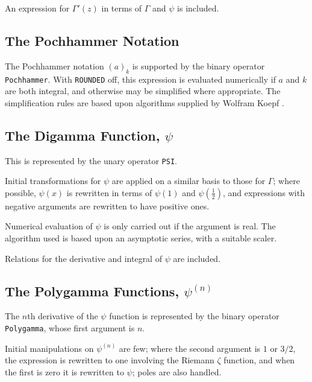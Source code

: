 \documentclass[11pt]{article}
\begin{document}
An expression for $\Gamma'(z)$ in terms of $\Gamma$ and $\psi$ is
included.



\subsection{The Pochhammer Notation}

The Pochhammer notation $(a)_k$ is supported by the binary operator {\tt
Pochhammer}.  With {\tt ROUNDED} off, this expression is evaluated
numerically if $a$ and $k$ are both integral, and otherwise may be
simplified where appropriate.  The simplification rules are based upon
algorithms supplied by Wolfram Koepf \cite{Koepf:92}.



\subsection{The Digamma Function, $\psi$}

This is represented by the unary operator {\tt PSI}.

Initial transformations for $\psi$ are applied on a similar basis to
those for $\Gamma$; where possible, $\psi(x)$ is rewritten in
terms of $\psi(1)$ and $\psi(\frac{1}{2})$, and expressions with negative
arguments are rewritten to have positive ones.

Numerical evaluation of $\psi$ is only carried out if the argument is
real. The algorithm used is based upon an asymptotic series, with a
suitable scaler.

Relations for the derivative and integral of $\psi$ are included.


\subsection{The Polygamma Functions, $\psi^{(n)}$}

The $n$th derivative of the $\psi$ function is represented by the
binary operator {\tt Polygamma}, whose first argument is $n$.

Initial manipulations on $\psi^{(n)}$ are few; where the second argument
is $1$ or $3/2$, the expression is rewritten to one involving the
Riemann $\zeta$ function, and when the first is zero it is rewritten to
$\psi$; poles are also handled.
\end{document}
